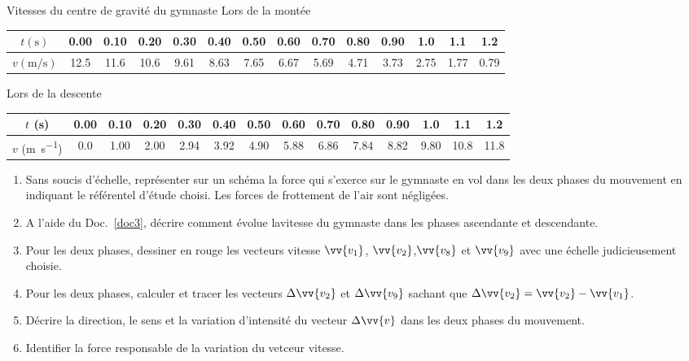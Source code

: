 \documentclass[a4paper,11pt,fleqn]{scrartcl}%
\begin{document}
    \noindent\begin{minipage}{\linewidth}
        \begin{documentboxenv}{Vitesses du centre de gravité du gymnaste}
        \label{doc3}
            Lors de la montée
            \begin{center}
                \begin{tabular}{|c|c|c|c|c|c|c|c|c|c|c|c|c|c|}
                    \hline
                    $t(\unit{\second})$ & 0.00&0.10&0.20&0.30&0.40&0.50&0.60&0.70&0.80&0.90&1.0&1.1&1.2\\
                    \hline
                    $v(\unit{\meter\per\second})$&12.5&11.6&10.6&9.61&8.63&7.65&6.67&5.69&4.71&3.73&2.75&1.77&0.79\\
                    \hline
                \end{tabular}
            \end{center}
            Lors de la descente
            \begin{center}
                \begin{tabular}{|c|c|c|c|c|c|c|c|c|c|c|c|c|c|}
                    \hline
                    $t$ (\unit{\second}) & 0.00&0.10&0.20&0.30&0.40&0.50&0.60&0.70&0.80&0.90&1.0&1.1&1.2\\
                    \hline
                    $v$ (\unit{\meter\per\second})&0.0&1.00&2.00&2.94&3.92&4.90&5.88&6.86&7.84&8.82&9.80&10.8&11.8\\
                    \hline
                \end{tabular}
            \end{center}
        \end{documentboxenv}
    \end{minipage}
    \begin{question}
        \begin{enumerate}
            \item Sans soucis d'échelle, représenter sur un schéma la force qui s'exerce sur le gymnaste en vol dans les deux phases du mouvement en indiquant le référentel d'étude choisi. Les forces de frottement de l'air sont négligées.
            \item A l'aide du Doc.~\ref{doc3}, décrire comment évolue lavitesse du gymnaste dans les phases ascendante et descendante.
            \item Pour les deux phases, dessiner en rouge les vecteurs vitesse $\vv{v_1}$, $\vv{v_2}$,$\vv{v_8}$ et $\vv{v_9}$ avec une échelle judicieusement choisie.
            \item Pour les deux phases, calculer et tracer les vecteurs $\Delta \vv{v_2}$ et $\Delta \vv{v_9}$ sachant que  $\Delta \vv{v_2} = \vv{v_2} - \vv{v_1}$.
            \item Décrire la direction, le sens et la variation d'intensité du vecteur  $\Delta \vv{v}$ dans les deux phases du mouvement.
            \item Identifier la force responsable de la variation du vetceur vitesse.
        \end{enumerate}
    \end{question}
\end{document}
